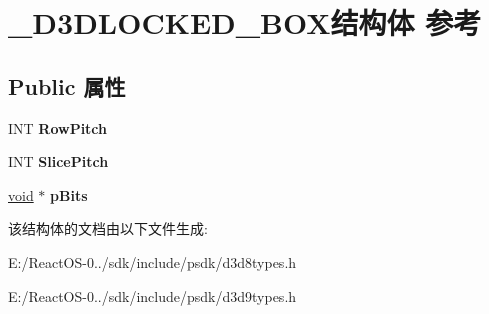 \hypertarget{struct___d3_d_l_o_c_k_e_d___b_o_x}{}\section{\+\_\+\+D3\+D\+L\+O\+C\+K\+E\+D\+\_\+\+B\+O\+X结构体 参考}
\label{struct___d3_d_l_o_c_k_e_d___b_o_x}
\subsection*{Public 属性}
\begin{DoxyCompactItemize}
\item 
\mbox{\label{struct___d3_d_l_o_c_k_e_d___b_o_x_aeed4818f7c0fa8f27aa3b33f88a17f7c}} 
I\+NT {\bfseries Row\+Pitch}
\item 
\mbox{\label{struct___d3_d_l_o_c_k_e_d___b_o_x_a3c4e31422b28314a955a8941b01dd31f}} 
I\+NT {\bfseries Slice\+Pitch}
\item 
\mbox{\label{struct___d3_d_l_o_c_k_e_d___b_o_x_aa8f1d5c04f28ae22e82163a0f9e96ee2}} 
\hyperlink{interfacevoid}{void} $\ast$ {\bfseries p\+Bits}
\end{DoxyCompactItemize}


该结构体的文档由以下文件生成\+:\begin{DoxyCompactItemize}
\item 
E\+:/\+React\+O\+S-\/0../sdk/include/psdk/d3d8types.\+h\item 
E\+:/\+React\+O\+S-\/0../sdk/include/psdk/d3d9types.\+h\end{DoxyCompactItemize}
